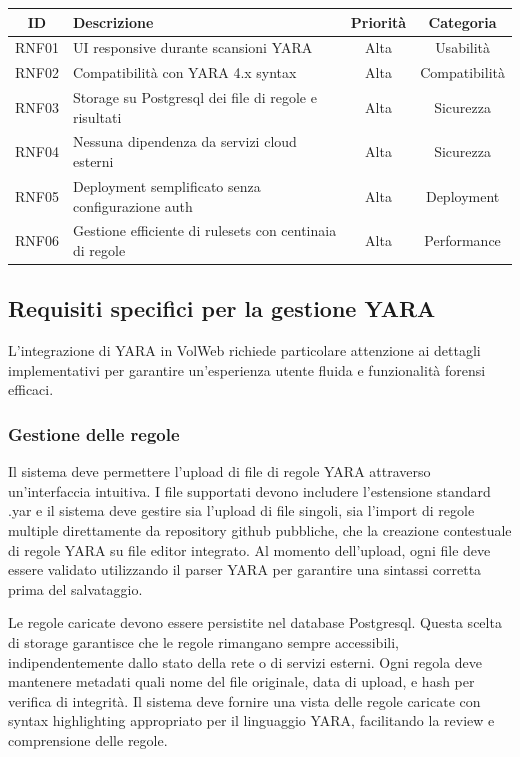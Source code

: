 \begin{tabularx}{\textwidth}{|c|X|c|c|}
\caption{Requisiti Non Funzionali del Sistema} \label{tab:requisiti-non-funzionali} \\
\hline
\textbf{ID} & \textbf{Descrizione} & \textbf{Priorità} & \textbf{Categoria} \\
\hline
RNF01 & UI responsive durante scansioni YARA & Alta & Usabilità \\
\hline
RNF02 & Compatibilità con YARA 4.x syntax & Alta & Compatibilità \\
\hline
RNF03 & Storage su Postgresql dei file di regole e risultati & Alta & Sicurezza \\
\hline
RNF04 & Nessuna dipendenza da servizi cloud esterni & Alta & Sicurezza \\
\hline
RNF05 & Deployment semplificato senza configurazione auth & Alta & Deployment \\
\hline
RNF06 & Gestione efficiente di rulesets con centinaia di regole & Alta & Performance \\
\hline
\end{tabularx}

\subsection{Requisiti specifici per la gestione YARA}

L'integrazione di YARA in VolWeb richiede particolare attenzione ai dettagli implementativi per garantire un'esperienza utente fluida e funzionalità forensi efficaci.

\subsubsection{Gestione delle regole}

Il sistema deve permettere l'upload di file di regole YARA attraverso un'interfaccia intuitiva. I file supportati devono includere l'estensione standard .yar e il sistema deve gestire sia l'upload di file singoli, sia l'import di regole multiple direttamente da repository github pubbliche, che la creazione contestuale di regole YARA su file editor integrato. Al momento dell'upload, ogni file deve essere validato utilizzando il parser YARA per garantire una sintassi corretta prima del salvataggio.

Le regole caricate devono essere persistite nel database Postgresql. Questa scelta di storage garantisce che le regole rimangano sempre accessibili, indipendentemente dallo stato della rete o di servizi esterni. Ogni regola deve mantenere metadati quali nome del file originale, data di upload, e hash per verifica di integrità. Il sistema deve fornire una vista delle regole caricate con syntax highlighting appropriato per il linguaggio YARA, facilitando la review e comprensione delle regole.


